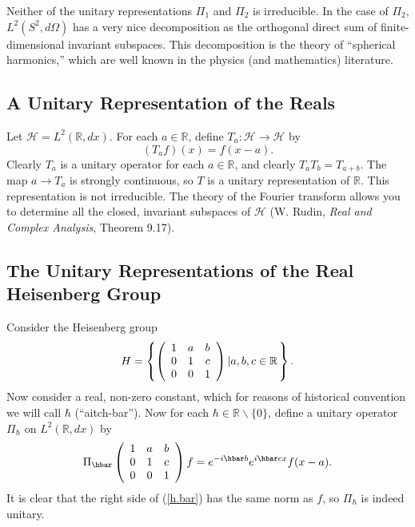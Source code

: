 \documentclass[12pt]{amsbook}
\theoremstyle{plain}
\numberwithin{equation}{chapter}
\numberwithin{theorem}{chapter}
\begin{document}
Neither of the unitary representations $\Pi_{1}$ and $\Pi_{2}$ is irreducible.
In the case of $\Pi_{2}$, $L^{2}(S^{2},d\Omega)$ has a very nice decomposition
as the orthogonal direct sum of finite-dimensional invariant subspaces. This
decomposition is the theory of ``spherical harmonics,'' which are well known
in the physics (and mathematics) literature.

\subsection{A Unitary Representation of the Reals}

Let $\mathcal{H}=L^{2}(\mathbb{R},dx)$. For each $a\in\mathbb{R}$, define
$T_{a}:\mathcal{H}\rightarrow\mathcal{H}$ by
\[
\left(  T_{a}f\right)  (x)=f(x-a)\text{.}%
\]
Clearly $T_{a}$ is a unitary operator for each $a\in\mathbb{R}$, and clearly
$T_{a}T_{b}=T_{a+b}$. The map $a\rightarrow T_{a}$ is strongly continuous, so
$T$ is a unitary representation of $\mathbb{R}$. This representation is not
irreducible. The theory of the Fourier transform allows you to determine all
the closed, invariant subspaces of $\mathcal{H}$ (W. Rudin, \textit{Real and
Complex Analysis}, Theorem 9.17).

\subsection{The Unitary Representations of the Real Heisenberg Group}

Consider the Heisenberg group
\[
H=\left\{  \left(
\begin{array}
[c]{ccc}%
1 & a & b\\
0 & 1 & c\\
0 & 0 & 1
\end{array}
\right)  \left|  a,b,c\in\mathbb{R}\right.  \right\}  \text{.}%
\]
Now consider a real, non-zero constant, which for reasons of historical
convention we will call $\hbar$ (``aitch-bar''). Now for each $\hbar
\in\mathbb{R}\backslash\{0\}$, define a unitary operator $\Pi_{\hbar}$ on
$L^{2}(\mathbb{R},dx)$ by
\begin{equation}
\Pi_{\hbar}\left(
\begin{array}
[c]{ccc}%
1 & a & b\\
0 & 1 & c\\
0 & 0 & 1
\end{array}
\right)  f=e^{-i\hbar b}e^{i\hbar cx}f(x-a)\text{.}\label{h.bar}%
\end{equation}
It is clear that the right side of (\ref{h.bar}) has the same norm as $f$, so
$\Pi_{\hbar}$ is indeed unitary.
\end{document}
